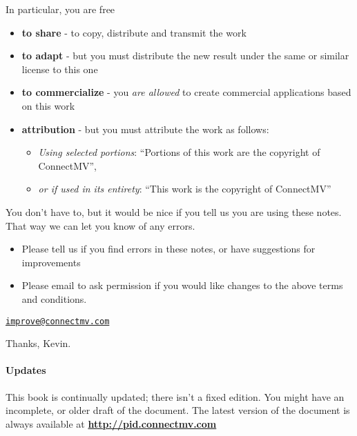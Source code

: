 In particular, you are free 
\begin{itemize}
	\item	\textbf{to share} - to copy, distribute and transmit the work
	\item	\textbf{to adapt} - but you must distribute the new result under the same or similar license to this one
	\item	\textbf{to commercialize} - you \emph{are allowed} to create commercial applications based on this work 
	\item	\textbf{attribution} - but you must attribute the work as follows:
	\begin{itemize}
		\item	\emph{Using selected portions}: ``Portions of this work are the copyright of ConnectMV'', 
		\item	\emph{or if used in its entirety}: ``This work is the copyright of ConnectMV''
	\end{itemize}
\end{itemize}

\vskip12pt

You don't have to, but it would be nice if you tell us you are using these notes. That way we can let you know of any errors.
\begin{itemize}
	\item	Please tell us if you find errors in these notes, or have suggestions for improvements
	\item	Please email to ask permission if you would like changes to the above terms and conditions.
\end{itemize}

\begin{center}
	{\LARGE \texttt{\href{mailto:improve@connectmv.com}{improve@connectmv.com}}}
\end{center}

Thanks, Kevin.

\vskip48pt

\paragraph{Updates}

This book is continually updated; there isn't a fixed edition. You might have an incomplete, or older draft of the document.  The latest version of the document is always available at \textbf{\href{http://pid.connectmv.com}{http://pid.connectmv.com}}





